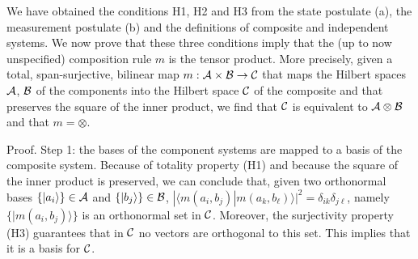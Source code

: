 \documentclass[aps,prl,amsmath,amssymb,twocolumn]{revtex4}
\theoremstyle{plain}
\theoremstyle{definition}
\theoremstyle{remark}
\def\>{\rangle}
\def\<{\langle}
\begin{document}
We have obtained the conditions H1, H2 and H3 from the state postulate
(a), the measurement postulate (b) and the definitions of composite
and independent systems. We now prove that these three conditions
imply that the (up to now unspecified) composition rule $m$ is the
tensor product. More precisely, given a total, span-surjective,
bilinear map $m:{\cal A}\times{\cal B}\to{\cal C}$ that maps the
Hilbert spaces $\cal A$, $\cal B$ of the components into the Hilbert
space $\cal C$ of the composite and that preserves the square of the
inner product, we find that $\cal C $ is equivalent to
$\cal A \otimes \cal B $ and that $m=\otimes$.
	
Proof. Step 1: the bases of the component systems are mapped to a
basis of the composite system. Because of totality property (H1) and
because the square of the inner product is preserved, we can conclude
that, given two orthonormal bases $\{|a_i\>\}\in{\cal A}$ and
$\{|b_j\>\}\in{\cal B}$,
$|\<m(a_i,b_j)|m(a_k,b_\ell)\>|^2=\delta_{ik}\delta_{j\ell}$, namely
$\{|m(a_i,b_j)\>\}$ is an orthonormal set in $\cal C$.  Moreover, the
surjectivity property (H3) guarantees that in $\cal C$ no vectors are
orthogonal to this set. This implies that it is a basis for $\cal C$.
	
\end{document}
